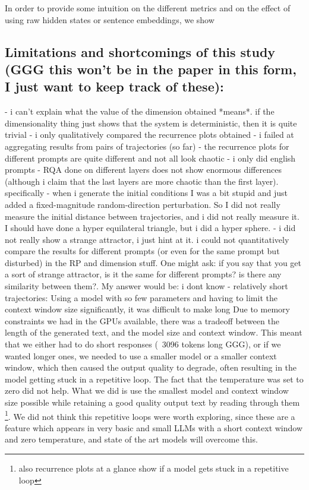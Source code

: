\documentclass[a4paper,12pt]{article}
\begin{document}
In order to provide some intuition on the different metrics and on the effect of using raw hidden states or sentence embeddings, we show 


\subsection{Limitations and shortcomings of this study (GGG this won't be in the paper in this form, I just want to keep track of these):}
\label{subsec:appendix_limitations}

- i can't explain what the value of the dimension obtained *means*. if the dimensionality thing just shows that the system is deterministic, then it is quite trivial
- i only qualitatively compared the recurrence plots obtained
- i failed at aggregating results from pairs of trajectories (so far)
- the recurrence plots for different prompts are quite different and not all look chaotic
- i only did english prompts
- RQA done on different layers does not show enormous differences (although i claim that the last layers are more chaotic than the first layer). specifically
- when i generate the initial conditions I was a bit stupid and just added a fixed-magnitude random-direction perturbation. So I did not really measure the initial distance between trajectories, and i did not really measure it. I should have done a hyper equilateral triangle, but i did a hyper sphere.
- i did not really show a strange attractor, i just hint at it. i could not quantitatively compare the results for different prompts (or even for the same prompt but disturbed) in the RP and dimension stuff. One might ask: if you say that you get a sort of strange attractor, is it the same for different prompts? is there any similarity between them?. My answer would be: i dont know
- relatively short trajectories:
Using a model with so few parameters and having to limit the context window size significantly, it was difficult to make long
Due to memory constraints we had in the GPUs available, there was a tradeoff between the length of the generated text, and the model size and context window. This meant that we either had to do short responses (~3096 tokens long GGG), or if we wanted longer ones, we needed to use a smaller model or a smaller context window, which then caused the output quality to degrade, often resulting in the model getting stuck in a repetitive loop. The fact that the temperature was set to zero did not help.
What we did is use the smallest model and context window size possible while retaining a good quality output text by reading through them \footnote{also recurrence plots at a glance show if a model gets stuck in a repetitive loop}. 
We did not think this repetitive loops were worth exploring, since these are a feature which appears in very basic and small LLMs with a short context window and zero temperature, and state of the art models will overcome this.
\end{document}
